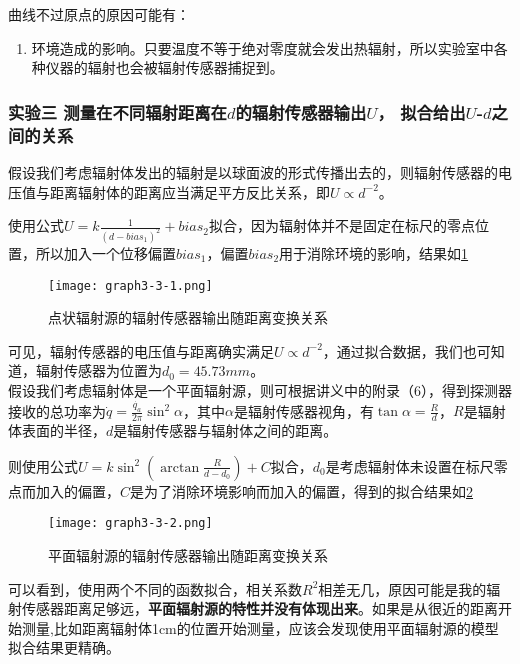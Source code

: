 \documentclass[dvipsnames, svgnames,a4paper,11pt]{article}
\begin{document}
	曲线不过原点的原因可能有：
	\begin{enumerate}
		\item 环境造成的影响。只要温度不等于绝对零度就会发出热辐射，所以实验室中各种仪器的辐射也会被辐射传感器捕捉到。
		

	\end{enumerate}
	





	\subsubsection{实验三 \quad 测量在不同辐射距离在$d$的辐射传感器输出$U$， 拟合给出$U$-$d$之间的关系}

	假设我们考虑辐射体发出的辐射是以球面波的形式传播出去的，则辐射传感器的电压值与距离辐射体的距离应当满足平方反比关系，即$U\propto d^{-2}$。

	使用公式$U=k\frac{1}{(d-bias_1)^{2}}+bias_2$拟合，因为辐射体并不是固定在标尺的零点位置，所以加入一个位移偏置$bias_1$，偏置$bias_2$用于消除环境的影响，结果如\cref{fig:graph3-3-1}

	\begin{figure}[htbp]
		\centering
		\texttt{[image: graph3-3-1.png]}
		\caption{点状辐射源的辐射传感器输出随距离变换关系}
		\label{fig:graph3-3-1}
	\end{figure}

	可见，辐射传感器的电压值与距离确实满足$U\propto d^{-2}$，通过拟合数据，我们也可知道，辐射传感器为位置为$d_0=45.73mm$。\\


	假设我们考虑辐射体是一个平面辐射源，则可根据讲义中的附录（6），得到探测器接收的总功率为$\dot{q}=\frac{\dot{q_a}}{2\pi}\sin^2\alpha$，其中$\alpha$是辐射传感器视角，有$\tan\alpha=\frac{R}{d}$，$R$是辐射体表面的半径，$d$是辐射传感器与辐射体之间的距离。

	则使用公式$U=k\sin^2(\arctan\frac{R}{d-d_0})+C$拟合，$d_0$是考虑辐射体未设置在标尺零点而加入的偏置，$C$是为了消除环境影响而加入的偏置，得到的拟合结果如\cref{fig:graph3-3-2}

	\begin{figure}[htbp]
		\centering
		\texttt{[image: graph3-3-2.png]}
		\caption{平面辐射源的辐射传感器输出随距离变换关系}
		\label{fig:graph3-3-2}
	\end{figure}

	可以看到，使用两个不同的函数拟合，相关系数$R^2$相差无几，原因可能是我的辐射传感器距离足够远，\textbf{平面辐射源的特性并没有体现出来}。如果是从很近的距离开始测量,比如距离辐射体1cm的位置开始测量，应该会发现使用平面辐射源的模型拟合结果更精确。
\end{document}
